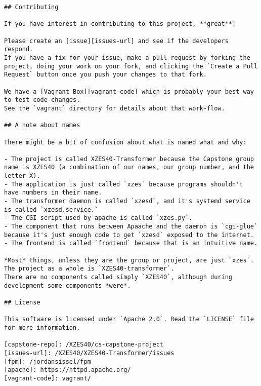 \begin{lstlisting}[caption={XZES40-Transformer project REDME}]
## Contributing

If you have interest in contributing to this project, **great**!

Please create an [issue][issues-url] and see if the developers respond.
If you have a fix for your issue, make a pull request by forking the project, doing your work on your fork, and clicking the `Create a Pull Request` button once you push your changes to that fork.

We have a [Vagrant Box][vagrant-code] which is probably your best way to test code-changes.
See the `vagrant` directory for details about that work-flow.

## A note about names

There might be a bit of confusion about what is named what and why:

- The project is called XZES40-Transformer because the Capstone group name is XZES40 (a combination of our names, our group number, and the letter X).
- The application is just called `xzes` because programs shouldn't have numbers in their name.
- The transformer daemon is called `xzesd`, and it's systemd service is called `xzesd.service.`
- The CGI script used by apache is called `xzes.py`.
- The component that runs between Apaache and the daemon is `cgi-glue` because it's just enough code to get `xzesd` exposed to the internet.
- The frontend is called `frontend` because that is an intuitive name.

*Most* things, unless they are the group or project, are just `xzes`.
The project as a whole is `XZES40-transformer`.
There are no components called simply `XZES40`, although during development some components *were*.

## License

This software is licensed under `Apache 2.0`. Read the `LICENSE` file for more information.

[capstone-repo]: /XZES40/cs-capstone-project
[issues-url]: /XZES40/XZES40-Transformer/issues
[fpm]: /jordansissel/fpm
[apache]: https://httpd.apache.org/
[vagrant-code]: vagrant/
\end{lstlisting}
